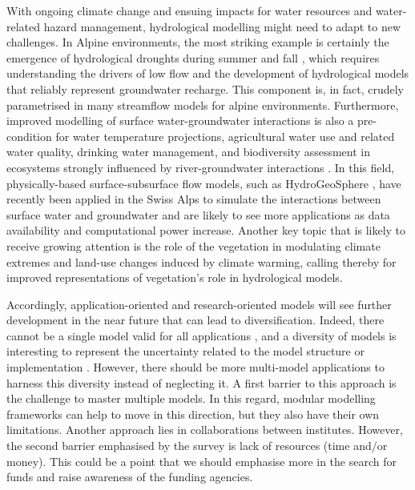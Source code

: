 \documentclass[10pt,a4paper]{article}
\begin{document}
With ongoing climate change and ensuing impacts for water resources and water-related hazard management, hydrological modelling might need to adapt to new challenges. In Alpine environments, the most striking example is certainly the emergence of hydrological droughts \citep{VanLoon2015} during summer and fall \citep{Brunner2019e, Rigling2020}, which requires understanding the drivers of low flow \citep{Arnoux2020} and the development of hydrological models that reliably represent groundwater recharge. This component is, in fact, crudely parametrised in many streamflow models for alpine environments. Furthermore, improved modelling of surface water-groundwater interactions is also a pre-condition for water temperature projections, agricultural water use and related water quality, drinking water management, and biodiversity assessment in ecosystems strongly influenced by river-groundwater interactions \citep{Brunner2017}. 
In this field, physically-based surface-subsurface flow models, such as HydroGeoSphere \citep{Therrien2010}, have recently been applied in the Swiss Alps to simulate the interactions between surface water and groundwater \citep{Tang2018, Thornton2021a} and are likely to see more applications as data availability and computational power increase. Another key topic that is likely to receive growing attention is the role of the vegetation in modulating climate extremes \citep{Mastrotheodoros2020} and land-use changes induced by climate warming, calling thereby for improved representations of vegetation's role in hydrological models.

Accordingly, application-oriented and research-oriented models will see further development in the near future that can lead to diversification. Indeed, there cannot be a single model valid for all applications \citep{Hamalainen2015}, and a diversity of models is interesting to represent the uncertainty related to the model structure or implementation \citep{Babel2019}. However, there should be more multi-model applications to harness this diversity instead of neglecting it. A first barrier to this approach is the challenge to master multiple models. In this regard, modular modelling frameworks can help to move in this direction, but they also have their own limitations. Another approach lies in collaborations between institutes. However, the second barrier emphasised by the survey is lack of resources (time and/or money). This could be a point that we should emphasise more in the search for funds and raise awareness of the funding agencies.
\end{document}

